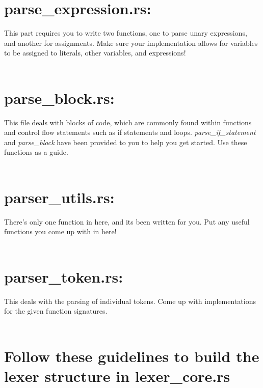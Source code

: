 \documentclass[
	12pt, %
]{fphw}
\begin{document}
\section*{parse\_expression.rs:}
This part requires you to write two functions, one to parse unary expressions, and another for assignments. Make sure your implementation allows for variables to be assigned to literals, other variables, and expressions! \\
\\

\section*{parse\_block.rs:}
This file deals with blocks of code, which are commonly found within functions and control flow statements such as if statements and loops. \textit{parse\_if\_statement} and \textit{parse\_block} have been provided to you to help you get started. Use these functions as a guide. \\
\\

\section*{parser\_utils.rs:}
There's only one function in here, and its been written for you. Put any useful functions you come up with in here! \\
\\

\section*{parser\_token.rs:}
This deals with the parsing of individual tokens. Come up with implementations for the given function signatures. \\
\\

\section*{Follow these guidelines to build the lexer structure in lexer\_core.rs}
\end{document}
